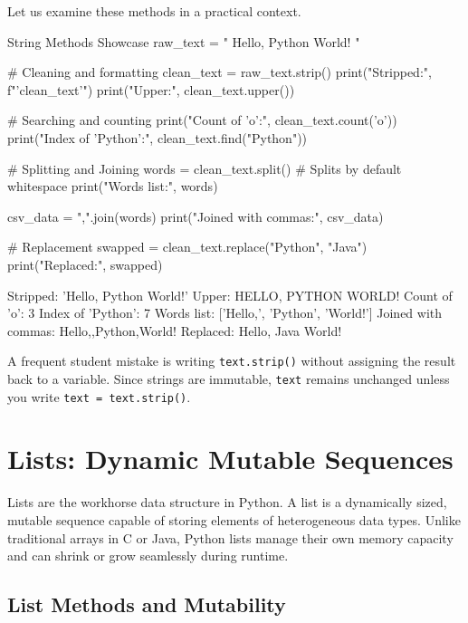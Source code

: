 Let us examine these methods in a practical context.

\begin{pythoncode}[]{String Methods Showcase}
raw_text = "   Hello, Python World!   "

# Cleaning and formatting
clean_text = raw_text.strip()
print("Stripped:", f"'{clean_text}'")
print("Upper:", clean_text.upper())

# Searching and counting
print("Count of 'o':", clean_text.count('o'))
print("Index of 'Python':", clean_text.find("Python"))

# Splitting and Joining
words = clean_text.split()  # Splits by default whitespace
print("Words list:", words)

csv_data = ",".join(words)
print("Joined with commas:", csv_data)

# Replacement
swapped = clean_text.replace("Python", "Java")
print("Replaced:", swapped)
\end{pythoncode}

\begin{outputbox}
Stripped: 'Hello, Python World!'
Upper: HELLO, PYTHON WORLD!
Count of 'o': 3
Index of 'Python': 7
Words list: ['Hello,', 'Python', 'World!']
Joined with commas: Hello,,Python,World!
Replaced: Hello, Java World!
\end{outputbox}

\begin{examtip}
\lpuBadge{} A frequent student mistake is writing \texttt{text.strip()} without assigning the result back to a variable. Since strings are immutable, \texttt{text} remains unchanged unless you write \texttt{text = text.strip()}.
\end{examtip}

\section{Lists: Dynamic Mutable Sequences}

Lists are the workhorse data structure in Python. A list is a dynamically sized, mutable sequence capable of storing elements of heterogeneous data types. Unlike traditional arrays in C or Java, Python lists manage their own memory capacity and can shrink or grow seamlessly during runtime.

\subsection{List Methods and Mutability}

